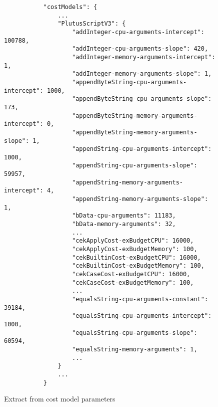 \documentclass[a4paper]{article}
\begin{document}
\begin{figure}[H]
  \centering \footnotesize
  \begin{verbatim}
           "costModels": {
               ...
               "PlutusScriptV3": {
                   "addInteger-cpu-arguments-intercept": 100788,
                   "addInteger-cpu-arguments-slope": 420,
                   "addInteger-memory-arguments-intercept": 1,
                   "addInteger-memory-arguments-slope": 1,
                   "appendByteString-cpu-arguments-intercept": 1000,
                   "appendByteString-cpu-arguments-slope": 173,
                   "appendByteString-memory-arguments-intercept": 0,
                   "appendByteString-memory-arguments-slope": 1,
                   "appendString-cpu-arguments-intercept": 1000,
                   "appendString-cpu-arguments-slope": 59957,
                   "appendString-memory-arguments-intercept": 4,
                   "appendString-memory-arguments-slope": 1,
                   "bData-cpu-arguments": 11183,
                   "bData-memory-arguments": 32,
                   ...
                   "cekApplyCost-exBudgetCPU": 16000,
                   "cekApplyCost-exBudgetMemory": 100,
                   "cekBuiltinCost-exBudgetCPU": 16000,
                   "cekBuiltinCost-exBudgetMemory": 100,
                   "cekCaseCost-exBudgetCPU": 16000,
                   "cekCaseCost-exBudgetMemory": 100,
                   ...
                   "equalsString-cpu-arguments-constant": 39184,
                   "equalsString-cpu-arguments-intercept": 1000,
                   "equalsString-cpu-arguments-slope": 60594,
                   "equalsString-memory-arguments": 1,
                   ...
               }
               ...
           }
\end{verbatim}
  \caption{Extract from cost model parameters}
  \label{fig:cost-model-parameters-extract}
\end{figure}
\end{document}
